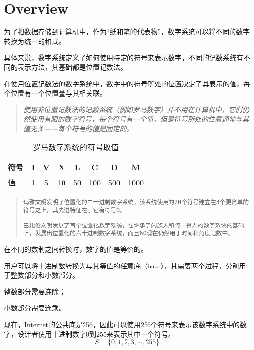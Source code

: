 \section{Overview}

为了把数据存储到计算机中，作为“纸和笔的代表物”，数字系统可以将不同的数字转换为统一的格式。

具体来说，数字系统定义了如何使用特定的符号来表示数字，不同的记数系统有不同的表示方法，其基础都是位置记数法。

在使用位置记数法的数字系统中，数字中的符号所处的位置决定了其表示的值，每个位置有一个位置量与其相关联。


\begin{quote}
\textsl{使用非位置记数法的记数系统（例如罗马数字）并不用在计算机中，它们仍然使用有限的数字符号，每个符号有一个值，但是符号所处的位置通常与其值无关——每个符号的值是固定的。}
\end{quote}

\begin{table}[htbp]
\centering
\caption{罗马数字系统的符号取值}
\begin{tabular}{l|ccccccc}
\hline
符号 & I &V &X &L & C& D &M\\
\hline
值 & 1 & 5 & 10 & 50 & 100 & 500 & 1000\\
\hline
\end{tabular}
\end{table}

\begin{quote}
\texttt{玛雅文明发明了位置化的二十进制数字系统，该系统使用的20个符号建立在3个更简单的符号之上，其先进特征在于它有符号0。}

\texttt{巴比伦文明发展了首个位置化数字系统，在继承了闪族人和阿卡得人的数字系统的基础上，发展出位置化的六十进制数字系统，而且60现在仍然用于时间和角度记数中。}
\end{quote}



在不同的数制之间转换时，数字的值是等价的。



用户可以将十进制数转换为与其等值的任意底（base），其需要两个过程，分别用于整数部分和小数部分。

\begin{compactitem}
\item 整数部分需要连除；
\item 小数部分需要连乘。
\end{compactitem}



现在，Internet的公共底是256，因此可以使用256个符号来表示该数字系统中的数字，设计者使用十进制数字0到255来表示其中一个符号。
\[S=\{0,1,2,3,\cdots,255\}\]

